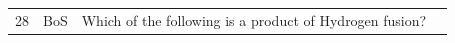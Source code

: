 \documentclass[10pt]{article}
\begin{document}
\begin{tiny}
\begin{longtable}{|r|p{0.375in}|p{1.275in}|p{3.5in}|}
28 &          BoS &                                                                                                                                                                                                                          Which of the following is a product of Hydrogen fusion? &                                                                                                                                                                                                                                                                                                                                                                                                                                                                                                                                                                                                                                                                                                                                                                                                                                                                                                                                                                                                                                                                                                                                                                                                                                                                                                                                                                                                                                                                                                                                                                                                                                                                                                                                                                                                                                                                                                                                                                                                                                                                                                                                                                                                                                                                                                                                                                                                                                                                                                                                                                                                                                                                                                                                                                                                                                                                                                                                                                                                                                                                                               
\end{longtable}
\end{tiny}
\end{document}
